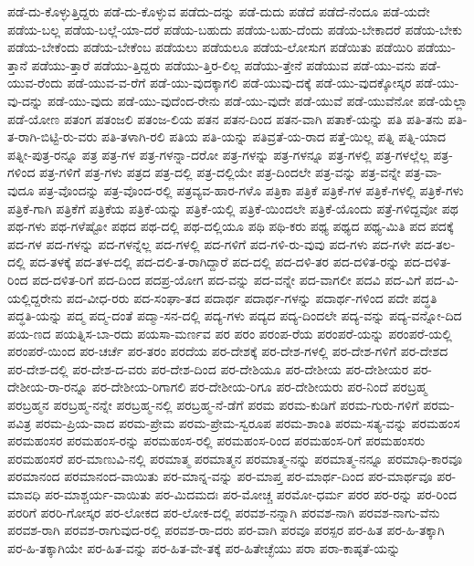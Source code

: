 {ಪಡೆ-ದು-ಕೊಳ್ಳುತ್ತಿದ್ದರು
ಪಡೆ-ದು-ಕೊಳ್ಳುವ
ಪಡೆದು-ದನ್ನು
ಪಡೆ-ದುದು
ಪಡೆದೆ
ಪಡೆದೆ-ನೆಂದೂ
ಪಡೆ-ಯದೇ
ಪಡೆಯ-ಬಲ್ಲ
ಪಡೆಯ-ಬಲ್ಲೆ-ಯಾ-ದರೆ
ಪಡೆಯ-ಬಹುದು
ಪಡೆಯ-ಬಹು-ದೆಂದು
ಪಡೆಯ-ಬೇಕಾದರೆ
ಪಡೆಯ-ಬೇಕು
ಪಡೆಯ-ಬೇಕೆಂದು
ಪಡೆಯ-ಬೇಕೆಂಬ
ಪಡೆಯಲು
ಪಡೆಯಲೂ
ಪಡೆಯ-ಲೋಸುಗ
ಪಡೆಯಿತು
ಪಡೆಯಿರಿ
ಪಡೆಯು-ತ್ತಾನೆ
ಪಡೆಯು-ತ್ತಾರೆ
ಪಡೆಯು-ತ್ತಿದ್ದರು
ಪಡೆಯು-ತ್ತಿರ-ಲಿಲ್ಲ
ಪಡೆಯು-ತ್ತೇನೆ
ಪಡೆಯುವ
ಪಡೆ-ಯು-ವನು
ಪಡೆ-ಯುವ-ರೆಂದು
ಪಡೆ-ಯುವ-ವ-ರೆಗೆ
ಪಡೆ-ಯು-ವುದಕ್ಕಾಗಲಿ
ಪಡೆ-ಯುವು-ದಕ್ಕೆ
ಪಡೆ-ಯು-ವುದಕ್ಕೋಸ್ಕರ
ಪಡೆ-ಯು-ವು-ದನ್ನು
ಪಡೆ-ಯು-ವುದು
ಪಡೆ-ಯು-ವುದೆಂದ-ರೇನು
ಪಡೆ-ಯು-ವುದೇ
ಪಡೆ-ಯುವೆ
ಪಡೆ-ಯುವೆನೋ
ಪಡೆ-ಯೆಲ್ಲಾ
ಪಡೆ-ಯೋಣ
ಪತಂಗ
ಪತಂಜಲಿ
ಪತಂಜ-ಲಿಯ
ಪತನ
ಪತನ-ದಿಂದ
ಪತನ-ವಾಗಿ
ಪತಾಕೆ-ಯನ್ನು
ಪತಿ
ಪತಿ-ತನು
ಪತಿ-ತ-ರಾಗಿ-ಬಿಟ್ಟಿ-ರು-ವರು
ಪತಿ-ತಳಾಗಿ-ರಲಿ
ಪತಿಯ
ಪತಿ-ಯನ್ನು
ಪತಿವ್ರತೆ-ಯ-ರಾದ
ಪತ್ತೆ-ಯಿಲ್ಲ
ಪತ್ನಿ
ಪತ್ನಿ-ಯಾದ
ಪತ್ನೀ-ಪುತ್ರ-ರನ್ನೂ
ಪತ್ರ
ಪತ್ರ-ಗಳ
ಪತ್ರ-ಗಳನ್ನಾ-ದರೋ
ಪತ್ರ-ಗಳನ್ನು
ಪತ್ರ-ಗಳನ್ನೂ
ಪತ್ರ-ಗಳಲ್ಲಿ
ಪತ್ರ-ಗಳಲ್ಲೆಲ್ಲ
ಪತ್ರ-ಗಳಿಂದ
ಪತ್ರ-ಗಳಿಗೆ
ಪತ್ರ-ಗಳು
ಪತ್ರದ
ಪತ್ರ-ದಲ್ಲಿ
ಪತ್ರ-ದಲ್ಲಿಯೇ
ಪತ್ರ-ದಿಂದಲೇ
ಪತ್ರ-ವನ್ನು
ಪತ್ರ-ವನ್ನೇ
ಪತ್ರ-ವಾ-ವುದೂ
ಪತ್ರ-ವೊಂದನ್ನು
ಪತ್ರ-ವೊಂದ-ರಲ್ಲಿ
ಪತ್ರವ್ಯವ-ಹಾರ-ಗಳೊ
ಪತ್ರಿಕಾ
ಪತ್ರಿಕೆ
ಪತ್ರಿಕೆ-ಗಳ
ಪತ್ರಿಕೆ-ಗಳಲ್ಲಿ
ಪತ್ರಿಕೆ-ಗಳು
ಪತ್ರಿಕೆ-ಗಾಗಿ
ಪತ್ರಿಕೆಗೆ
ಪತ್ರಿಕೆಯ
ಪತ್ರಿಕೆ-ಯನ್ನು
ಪತ್ರಿಕೆ-ಯಲ್ಲಿ
ಪತ್ರಿಕೆ-ಯಿಂದಲೇ
ಪತ್ರಿಕೆ-ಯೊಂದು
ಪತ್ರೆ-ಗಳಿದ್ದವೋ
ಪಥ
ಪಥ-ಗಳು
ಪಥ-ಗಳೆಷ್ಟೋ
ಪಥದ
ಪಥ-ದಲ್ಲಿ
ಪಥ-ದಲ್ಲಿಯೂ
ಪಥಿ
ಪಥಿ-ಕರು
ಪಥ್ಯ
ಪಥ್ಯದ
ಪಥ್ಯ-ಮಿತಿ
ಪದ
ಪದಕ್ಕೆ
ಪದ-ಗಳ
ಪದ-ಗಳನ್ನು
ಪದ-ಗಳನ್ನೆಲ್ಲ
ಪದ-ಗಳಲ್ಲಿ
ಪದ-ಗಳಿಗೆ
ಪದ-ಗಳಿ-ರು-ವುವು
ಪದ-ಗಳು
ಪದ-ಗಳೇ
ಪದ-ತಲ-ದಲ್ಲಿ
ಪದ-ತಳಕ್ಕೆ
ಪದ-ತಳ-ದಲ್ಲಿ
ಪದ-ದಲಿ-ತ-ರಾಗಿದ್ದಾರೆ
ಪದ-ದಲ್ಲಿ
ಪದ-ದಳಿ-ತರ
ಪದ-ದಳಿತ-ರನ್ನು
ಪದ-ದಳಿತ-ರಿಂದ
ಪದ-ದಳಿತ-ರಿಗೆ
ಪದ-ದಿಂದ
ಪದಪ್ರ-ಯೋಗ
ಪದ-ವನ್ನು
ಪದ-ವನ್ನೇ
ಪದ-ವಾಗಲೀ
ಪದವಿ
ಪದ-ವಿಗೆ
ಪದ-ವಿ-ಯಲ್ಲಿದ್ದರೇನು
ಪದ-ವೀಧ-ರರು
ಪದ-ಸಂಘಾ-ತದ
ಪದಾರ್ಥ
ಪದಾರ್ಥ-ಗಳನ್ನು
ಪದಾರ್ಥ-ಗಳಿಂದ
ಪದೇ
ಪದ್ಧತಿ
ಪದ್ಧತಿ-ಯನ್ನು
ಪದ್ಮ
ಪದ್ಮ-ದಂತೆ
ಪದ್ಮಾ-ಸನ-ದಲ್ಲಿ
ಪದ್ಯ-ಗಳು
ಪದ್ಯದ
ಪದ್ಯ-ದಿಂದಲೇ
ಪದ್ಯ-ವನ್ನು
ಪದ್ಯ-ವನ್ನೋ-ದಿದ
ಪಯ-ಣದ
ಪಯತ್ನಿಸ-ಬಾ-ರದು
ಪಯಸಾ-ಮರ್ಣವ
ಪರ
ಪರಂ
ಪರಂಪ-ರೆಯ
ಪರಂಪರೆ-ಯನ್ನು
ಪರಂಪರೆ-ಯಲ್ಲಿ
ಪರಂಪರೆ-ಯಿಂದ
ಪರ-ಚರ್ಚೆ
ಪರ-ತರಂ
ಪರದೆಯ
ಪರ-ದೇಶಕ್ಕೆ
ಪರ-ದೇಶ-ಗಳಲ್ಲಿ
ಪರ-ದೇಶ-ಗಳಿಗೆ
ಪರ-ದೇಶದ
ಪರ-ದೇಶ-ದಲ್ಲಿ
ಪರ-ದೇಶ-ದ-ವರು
ಪರ-ದೇಶ-ದಿಂದ
ಪರ-ದೇಶಿಯೂ
ಪರ-ದೇಶೀಯ
ಪರ-ದೇಶೀಯರ
ಪರ-ದೇಶೀಯ-ರಾ-ರನ್ನೂ
ಪರ-ದೇಶೀಯ-ರಿಗಾಗಲಿ
ಪರ-ದೇಶೀಯ-ರಿಗೂ
ಪರ-ದೇಶೀಯರು
ಪರ-ನಿಂದೆ
ಪರಬ್ರಹ್ಮ
ಪರಬ್ರಹ್ಮನ
ಪರಬ್ರಹ್ಮ-ನನ್ನೇ
ಪರಬ್ರಹ್ಮ-ನಲ್ಲಿ
ಪರಬ್ರಹ್ಮ-ನೆ-ಡೆಗೆ
ಪರಮ
ಪರಮ-ಕುಡಿಗೆ
ಪರಮ-ಗುರು-ಗಳಿಗೆ
ಪರಮ-ಪವಿತ್ರ
ಪರಮ-ಪ್ರಿಯ-ವಾದ
ಪರಮ-ಪ್ರೇಮ
ಪರಮ-ಪ್ರೇಮ-ಸ್ವರೂಪ
ಪರಮ-ಶಾಂತಿ
ಪರಮ-ಸತ್ಯ-ವನ್ನು
ಪರಮಹಂಸ
ಪರಮಹಂಸರ
ಪರಮಹಂಸ-ರನ್ನು
ಪರಮಹಂಸ-ರಲ್ಲಿ
ಪರಮಹಂಸ-ರಿಂದ
ಪರಮಹಂಸ-ರಿಗೆ
ಪರಮಹಂಸರು
ಪರಮಹಂಸರೆ
ಪರ-ಮಾಣುವಿ-ನಲ್ಲಿ
ಪರಮಾತ್ಮ
ಪರಮಾತ್ಮನ
ಪರಮಾತ್ಮ-ನನ್ನು
ಪರಮಾತ್ಮ-ನನ್ನೂ
ಪರಮಾಧಿ-ಕಾರವೂ
ಪರಮಾನಂದ
ಪರಮಾನಂದ-ವಾಯಿತು
ಪರ-ಮಾನ್ನ-ವನ್ನು
ಪರ-ಮಾಪ್ತ
ಪರ-ಮಾರ್ಥ-ದಿಂದ
ಪರ-ಮಾರ್ಥವೂ
ಪರ-ಮಾವಧಿ
ಪರ-ಮಾಶ್ಚರ್ಯ-ವಾಯಿತು
ಪರ-ಮಿದಮದಃ
ಪರ-ಮೋಚ್ಚ
ಪರಮೋ-ಧರ್ಮ
ಪರರ
ಪರ-ರನ್ನು
ಪರ-ರಿಂದ
ಪರರಿಗೆ
ಪರರಿ-ಗೋಸ್ಕರ
ಪರ-ಲೋಕದ
ಪರ-ಲೋಕ-ದಲ್ಲಿ
ಪರವಶ-ನನ್ನಾಗಿ
ಪರವಶ-ನಾಗಿ
ಪರವಶ-ನಾಗು-ವೆನು
ಪರವಶ-ರಾಗಿ
ಪರವಶ-ರಾಗುವುದ-ರಲ್ಲಿ
ಪರವಶ-ರಾ-ದರು
ಪರ-ವಾಗಿ
ಪರವೂ
ಪರಸ್ಪರ
ಪರ-ಹಿತ
ಪರ-ಹಿ-ತಕ್ಕಾಗಿ
ಪರ-ಹಿ-ತಕ್ಕಾಗಿಯೇ
ಪರ-ಹಿತ-ವನ್ನು
ಪರ-ಹಿತ-ವೇ-ತಕ್ಕೆ
ಪರ-ಹಿತೇಚ್ಛೆಯು
ಪರಾ
ಪರಾ-ಕಾಷ್ಠತೆ-ಯನ್ನು
}
